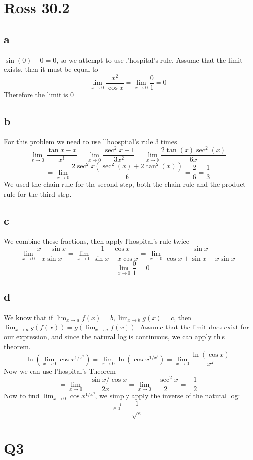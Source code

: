 \documentclass[12pt]{article}
\begin{document}
\section{Ross 30.2}
\subsection{a}
$\sin(0)-0=0$, so we attempt to use l'hospital's rule. Assume that the limit exists, then it must be equal to
$$\lim_{x \to 0}\frac{x^2}{\cos x} = \lim_{x \to 0}\frac{0}{1} = 0$$
Therefore the limit is 0

\subsection{b}
For this problem we need to use l'hoospital's rule 3 times
$$\lim_{x \to 0} \frac{\tan x-x}{x^3} = \lim_{x \to 0} \frac{\sec^2 x-1}{3x^2} = \lim_{x \to 0}\frac{2\tan(x)\sec^2(x)}{6x}$$
$$= \lim_{x \to 0}\frac{2 \sec^2x (\sec^2(x) + 2 \tan^2(x))}{6} = \frac{2}{6} = \frac{1}{3}$$
We used the chain rule for the second step, both the chain rule and the product rule for the third step.

\subsection{c}
We combine these fractions, then apply l'hospital's rule twice:
$$\lim_{x\to 0}\frac{x-\sin x}{x\sin x} = \lim_{x\to 0}\frac{1-\cos x}{\sin x + x\cos x} = \lim_{x\to 0}\frac{\sin x}{\cos x + \sin x - x \sin x} $$
$$= \lim_{x\to 0}\frac{0}{1} = 0$$

\subsection{d}
We know that if $\lim_{x \to a} f(x)=b, \lim_{x \to b} g(x)=c$, then $\lim_{x \to a}g(f(x)) = g(\lim_{x \to a}f(x))$. Assume that the limit does exist for our expression, and since the natural log is continuous, we can apply this theorem.
\newline
$$\ln(\lim_{x \to 0} \cos x ^{1/x^2}) = \lim_{x \to 0} \ln(\cos x^{1/x^2}) = \lim_{x \to 0}\frac{\ln(\cos x)}{x^2}$$
Now we can use l'hospital's Theorem
$$=\lim_{x \to 0}\frac{-\sin x / \cos x}{2x} = \lim_{x \to 0}\frac{- \sec^2 x}{2} = -\frac{1}{2}$$
Now to find $\lim_{x \to 0} \cos x ^{1/x^2}$, we simply apply the inverse of the natural log:
$$e^\frac{-1}{2} = \frac{1}{\sqrt e}$$
\newpage


\section{Q3}
\end{document}
